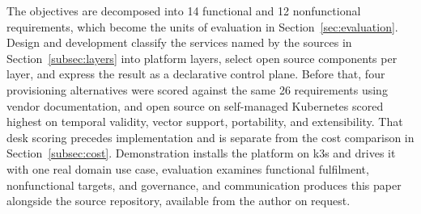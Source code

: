 The objectives are decomposed into 14 functional and 12 nonfunctional requirements, which become the units of evaluation in Section~\ref{sec:evaluation}. Design and development classify the services named by the sources in Section~\ref{subsec:layers} into platform layers, select open source components per layer, and express the result as a declarative control plane. Before that, four provisioning alternatives were scored against the same 26 requirements using vendor documentation, and open source on self-managed Kubernetes scored highest on temporal validity, vector support, portability, and extensibility. That desk scoring precedes implementation and is separate from the cost comparison in Section~\ref{subsec:cost}. Demonstration installs the platform on k3s and drives it with one real domain use case, evaluation examines functional fulfilment, nonfunctional targets, and governance, and communication produces this paper alongside the source repository, available from the author on request.

